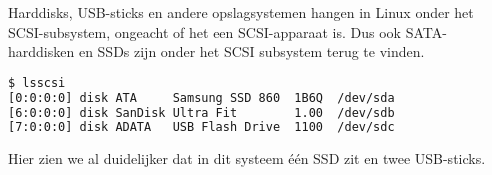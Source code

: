 Harddisks, USB-sticks en andere opslagsystemen hangen in Linux onder het SCSI-subsystem, ongeacht of het een SCSI-apparaat is. Dus ook SATA-harddisken en SSDs zijn onder het SCSI subsystem terug te vinden. 

\begin{lstlisting}[language=bash]
$ lsscsi
[0:0:0:0] disk ATA     Samsung SSD 860  1B6Q  /dev/sda 
[6:0:0:0] disk SanDisk Ultra Fit        1.00  /dev/sdb 
[7:0:0:0] disk ADATA   USB Flash Drive  1100  /dev/sdc
\end{lstlisting}
Hier zien we al duidelijker dat in dit systeem \'e\'en SSD zit en twee USB-sticks.

